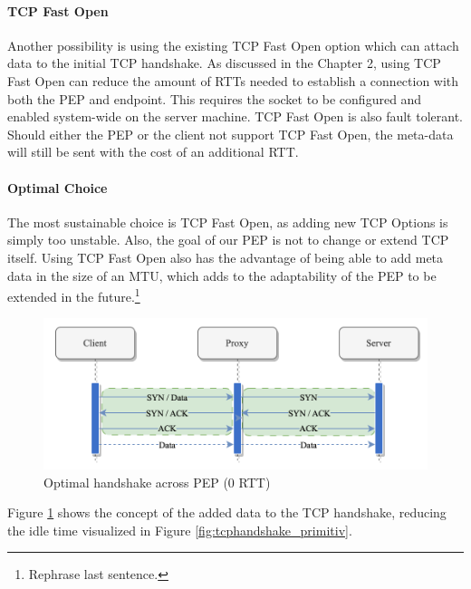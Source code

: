 \documentclass[a4paper,english, 11pt]{report}
\begin{document}
\paragraph{TCP Fast Open}
Another possibility is using the existing TCP Fast Open option which can attach data to the initial TCP handshake. As discussed in the Chapter 2, using TCP Fast Open can reduce the amount of RTTs needed to establish a connection with both the PEP and endpoint. This requires the socket to be configured and enabled system-wide on the server machine. TCP Fast Open is also fault tolerant. Should either the PEP or the client not support TCP Fast Open, the meta-data will still be sent with the cost of an additional RTT. 

\paragraph{Optimal Choice}
The most sustainable choice is TCP Fast Open, as adding new TCP Options is simply too unstable. Also, the goal of our PEP is not to change or extend TCP itself. Using TCP Fast Open also has the advantage of being able to add meta data in the size of an MTU, which adds to the adaptability of the PEP to be extended in the future.\footnote{Rephrase last sentence.}\\

\begin{figure} %
	\centering
	\includegraphics[scale=0.75]{../diagrams/drawio/tcphandshake_optimal.png}
  	\caption{Optimal handshake across PEP (0 RTT)}
  	\label{fig:tcphandshake_optimal}
\end{figure}

Figure \ref{fig:tcphandshake_optimal} shows the concept of the added data to the TCP handshake, reducing the idle time visualized in Figure \ref{fig:tcphandshake_primitiv}. 

\end{document}
